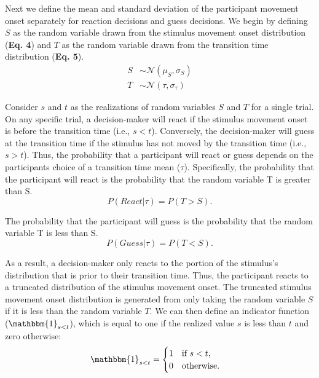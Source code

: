 \documentclass[12pt]{article}
\newcommand\boldblue[1]{\textcolor{mydarkblue}{\textbf{#1}}}
\begin{document}
Next we define the mean and standard deviation of the participant movement onset separately for reaction decisions and guess decisions. We begin by defining $S$ as the random variable drawn from the stimulus movement onset distribution (\boldblue{Eq. 4}) and $T$ as the random variable drawn from the transition time distribution (\boldblue{Eq. 5}).
\begin{align}
    S & \sim\mathcal{N}(\mu_{S},\sigma_{S}) \\
    T & \sim\mathcal{N}(\tau,\sigma_{\tau})
\end{align}

Consider $s$ and $t$ as the realizations of random variables $S$ and $T$ for a single trial. On any specific trial, a decision-maker will react if the stimulus movement onset is before the transition time (i.e., $s<t$). Conversely, the decision-maker will guess at the transition time if the stimulus has not moved by the transition time (i.e., $s>t$). Thus, the probability that a participant will react or guess depends on the participants choice of a transition time mean ($\tau$). Specifically, the probability that the participant will react is the probability that the random variable T is greater than S.
\begin{equation}
    P(React|\tau) = P(T>S).
\end{equation}

The probability that the participant will guess is the probability that the random variable T is less than S.
\begin{equation}
    P(Guess|\tau) = P(T<S).
\end{equation}

As a result, a decision-maker only reacts to the portion of the stimulus’s distribution that is prior to their transition time. Thus, the participant reacts to a truncated distribution of the stimulus movement onset. The truncated stimulus movement onset distribution is generated from only taking the random variable $S$ if it is less than the random variable $T$. We can then define an indicator function ($\mathbbm{1}_{s<t}$), which is equal to one if the realized value $s$ is less than $t$ and zero otherwise:
\begin{align}
     & \mathbbm{1}_{s<t} =
    \begin{cases}
        1 & \text{if } s < t, \\
        0 & \text{otherwise.}
    \end{cases}
\end{align}
\end{document}
